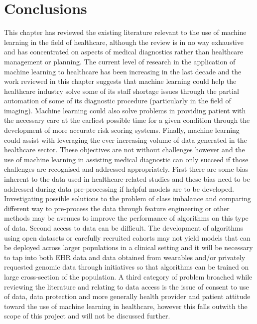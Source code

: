 \section{Conclusions}
This chapter has reviewed the existing literature relevant to the use of machine learning in the field of healthcare, although the review is in no way exhaustive and has concentrated on aspects of medical diagnostics rather than healthcare management or planning.\newline 
The current level of research in the application of machine learning to healthcare has been increasing in the last decade and the work reviewed in this chapter suggests that machine learning could help the healthcare industry solve some of its staff shortage issues through the partial automation of some of its diagnostic procedure (particularly in the field of imaging). Machine learning could also solve problems in providing patient with the necessary care at the earliest possible time for a given condition through the development of more accurate risk scoring systems. Finally, machine learning could assist with leveraging the ever increasing volume of data generated in the healthcare sector.\newline
These objectives are not without challenges however and the use of machine learning in assisting medical diagnostic can only succeed if those challenges are recognised and addressed appropriately.\newline
First there are some bias inherent to the data used in healthcare-related studies and these bias need to be addressed during data pre-processing if helpful models are to be developed. Investigating possible solutions to the problem of class imbalance and comparing different way to pre-process the data through feature engineering or other methods may be avenues to improve the performance of algorithms on this type of data.\newline
Second access to data can be difficult. The development of algorithms using open datasets or carefully recruited cohorts may not yield models that can be deployed across larger populations in a clinical setting and it will be necessary to tap into both EHR data and data obtained from wearables and/or privately requested genomic data through initiatives so that algorithms can be trained on large cross-section of the population.
\newline
A third category of problem broached while reviewing the literature and relating to data access is the issue of consent to use of data, data protection and more generally health provider and patient attitude toward the use of machine learning in healthcare, however this falls outwith the scope of this project and will not be discussed further.\newline




